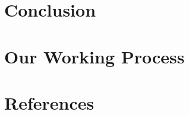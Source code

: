 \documentclass[
]{book}
\begin{document}
\hypertarget{conclusion}{%
\chapter{Conclusion}\label{conclusion}}

\hypertarget{our-working-process}{%
\chapter{Our Working Process}\label{our-working-process}}

\hypertarget{references}{%
\chapter{References}\label{references}}

  
\end{document}
